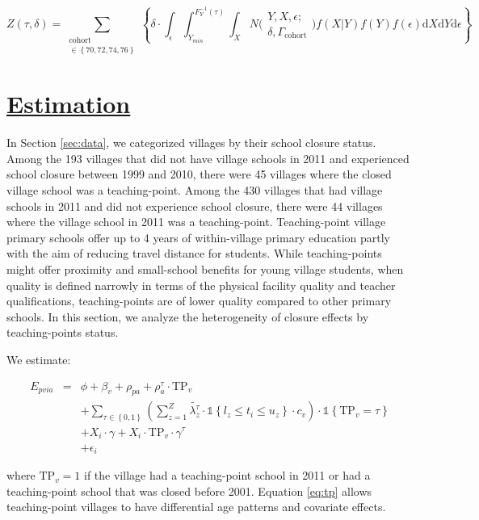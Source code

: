 \documentclass[12pt,english]{article}
\begin{document}
\begin{equation}
\label{eq:targetcost}
Z\left(\tau,\delta\right) =
\sum\limits_{
	\substack{
	\mathrm{cohort} \\ \in{\left\{70,72,74,76\right\}}}
	}
\left\{\delta\cdot
\int_{\epsilon}
\int_{Y_{min}}^{F_{Y}^{-1}\left(\tau\right)}
\int_{X}
N\Big(
\substack{
	Y,X,\epsilon; \\
	\delta, \Gamma_{\mathrm{cohort}}
}
\Big)f\left(X|Y\right)f\left(Y\right)f\left(\epsilon\right)\mathrm{d}X\mathrm{d}Y\mathrm{d}\epsilon\right\}
\end{equation}

\section{\href{https://papers.ssrn.com/sol3/papers.cfm?abstract_id=3140132}{Estimation}}

In Section \ref{sec:data}, we categorized villages by their school closure status. Among the 193 villages that did not have village schools in 2011 and experienced school closure between 1999 and 2010, there were 45 villages where the closed village school was a teaching-point. Among the 430 villages that had village schools in 2011 and did not experience school closure, there were 44 villages where the village school in 2011 was a teaching-point. Teaching-point village primary schools offer up to 4 years of within-village primary education partly with the aim of reducing travel distance for students. While teaching-points might offer proximity and small-school benefits for young village students, when quality is defined  narrowly in terms of the physical facility quality and teacher qualifications, teaching-points are of lower quality compared to other primary schools. In this section, we analyze the heterogeneity of closure effects by teaching-points status.

We estimate:
\begin{singlespace}\vspace*{-\baselineskip}
	\begin{eqnarray}
	\label{eq:tp}
	E_{pvia} & = & \phi + \beta_{v}  + \rho_{pa} + \rho^{\tau}_{a} \cdot \text{TP}_{v}
	\nonumber \\
	&  & + \sum_{\tau \in \left\{0, 1\right\}}
	\left(
	\sum_{z=1}^Z \tilde{\lambda^{\tau}_{z}} \cdot \mathbb{1} \left\{ l_{z}\leq t_{i}\leq u_{z} \right\}
	\cdot c_{v}
	\right)
	\cdot \mathbb{1} \left\{ \text{TP}_{v} = \tau \right\}
	\\
	&  &
	+ X_i \cdot \gamma + X_i \cdot \text{TP}_{v} \cdot \gamma^{\tau} \nonumber\\
	&  & + \epsilon_{i}  \nonumber
	\end{eqnarray}
\end{singlespace}\noindent\ignorespaces
where $\text{TP}_v = 1$ if the village had a teaching-point school in 2011 or had a teaching-point school that was closed before 2001. Equation \ref{eq:tp} allows teaching-point villages to have differential age patterns and covariate effects.
\end{document}
